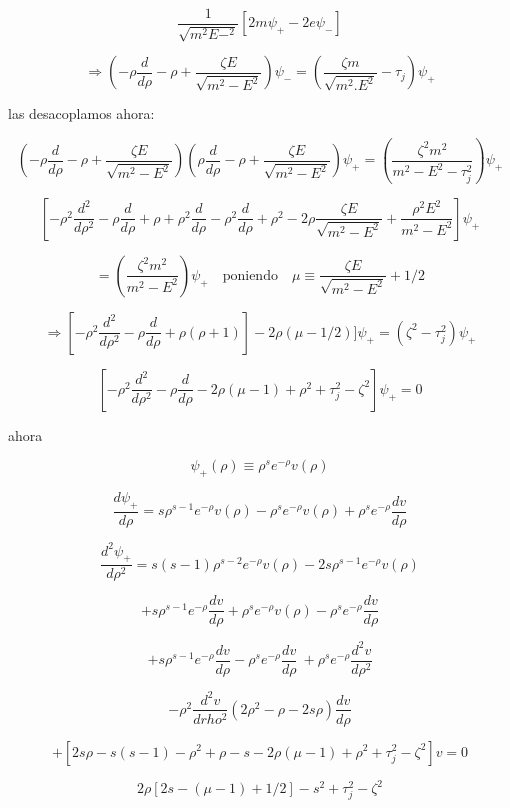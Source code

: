 \documentclass{report}
\begin{document}
\[\frac{1}{\sqrt{m^2 E-^2}} [2m \psi _+ - 2e \psi _- ]\]

\begin{equation}
\Rightarrow (- \rho \frac{d}{d\rho} - \rho + \frac{\zeta E}{\sqrt{m^2 - E^2}}) \psi _- = (\frac{\zeta m}{\sqrt{m^2 . E^2}} - \tau _{j})\psi _+ 
\end{equation}

las desacoplamos ahora:

\[(- \rho \frac{d}{d\rho} - \rho + \frac{\zeta E}{\sqrt{m^2 - E^2 }}) (\rho \frac{d}{d\rho} -\rho + \frac{\zeta E}{\sqrt{m^2 - E^2 }}) \psi _+ = (\frac{\zeta ^2 m^2 }{m^2 - E^2 - \tau ^{2}_{j}}) \psi _+ \]

\[[- \rho ^2 \frac{d^2 }{d \rho ^2 } - \rho \frac{d}{d \rho } + \rho + \rho^2 \frac{d}{d\rho} - \rho^2 \frac{d}{d \rho } + \rho ^2 - 2 \rho \frac{\zeta E}{\sqrt{m^2 - E^2 }} + \frac{\rho^2 E^2 }{m^2 - E^2 }] \psi_+  \]

\[= (\frac{\zeta^2 m^2 }{m^2 - E^2 })\psi_+ \quad \text{poniendo} \quad \mu \equiv \frac{\zeta E}{\sqrt{m^2 - E^2 }} + 1/2\]

\[\Rightarrow [-\rho ^2 \frac{d^2 }{d\rho ^2 } -\rho \frac{d}{d\rho } + \rho (\rho + 1)] - 2 \rho (\mu - 1/2 )] \psi _+ = (\zeta ^2 - \tau_{j}^{2})\psi _+ \]

\[[- \rho ^2 \frac{d^2 }{d \rho ^2} - \rho \frac{d}{d \rho } -2\rho (\mu - 1)+ \rho^2 + \tau_{j}^{2} - \zeta ^2 ] \psi _+ = 0 \]

ahora

\[\psi _+ (\rho ) \equiv \rho^s e^{- \rho } v(\rho )\]

\[\frac{d \psi _+}{d \rho } = s \rho^{s-1} e^{-\rho } v (\rho) - \rho^s e^{- \rho} v (\rho ) + \rho ^{s} e^{-\rho} \frac{dv}{d \rho }\]

\[\frac{d^2 \psi _+ }{d \rho ^2} = s(s-1) \rho ^{s-2} e^{-\rho } v (\rho ) - 2 s \rho ^{s-1} e^{-\rho } v (\rho )\]

\[+ s \rho ^{s-1} e^{-\rho} \frac{dv}{d\rho } + \rho^s e^{-\rho } v (\rho ) - \rho ^s e^{- \rho} \frac{dv}{d \rho} \]

\[+ s \rho ^{s-1} e^{- \rho} \frac{dv}{d \rho } - \rho ^s e^{- \rho } \frac{dv}{d \rho }\ + \rho ^s e^{- \rho} \frac{d^2 v}{d \rho ^2 }\]

\[- \rho^2 \frac{d^2 v}{d rho ^2} (2 \rho^2 - \rho -2s\rho ) \frac{dv}{d \rho }\]

\[+[2s\rho - s(s-1) - \rho ^2 + \rho - s - 2 \rho (\mu - 1) + \rho ^2 + \tau^{2}_{j} - \zeta ^2 ] v = 0\]

\[2 \rho [2s - (\mu -1)+1/2] -s^2 + \tau_{j}^{2}- \zeta ^2 \]
\end{document}
